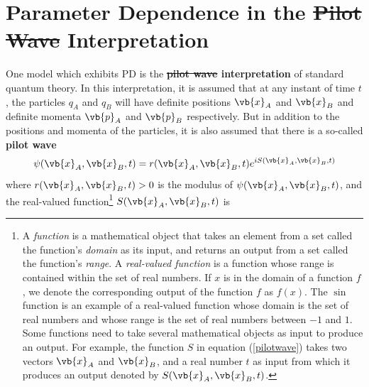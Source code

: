 \documentclass[12pt]{report}
\providecommand{\DIFadd}[1]{{\protect\color{blue}\uwave{#1}}} %
\providecommand{\DIFdel}[1]{{\protect\color{red}\sout{#1}}}                      %
\providecommand{\DIFaddbegin}{} %
\providecommand{\DIFaddend}{} %
\providecommand{\DIFdelbegin}{} %
\providecommand{\DIFdelend}{} %
\begin{document}
\section{Parameter Dependence in the \DIFdelbegin \DIFdel{Pilot Wave }\DIFdelend \DIFaddbegin \DIFadd{Bohmian }\DIFaddend Interpretation}\label{PI}
One model which exhibits PD is the \textbf{\DIFdelbegin \DIFdel{pilot wave }\DIFdelend \DIFaddbegin \DIFadd{Bohmian }\DIFaddend interpretation}\DIFdelbegin %
\DIFdelend \DIFaddbegin {} \DIFaddend of standard quantum theory. In this interpretation, it is assumed that at any instant of time $t$, the particles $q_A$ and $q_B$ will have definite positions $\vb{x}_A$ and $\vb{x}_B$ %
\DIFdelbegin %
\DIFdelend \DIFaddbegin {}\DIFaddend %
and definite momenta $\vb{p}_A$ and $\vb{p}_B$ %
\DIFdelbegin %
\DIFdelend \DIFaddbegin {}\DIFaddend %
respectively. But in addition to the positions and momenta of the particles, it is also assumed that there is a so-called \textbf{pilot wave} 
\begin{equation}\label{pilotwave}
\psi(\vb{x}_A, \vb{x}_B, t)=r(\vb{x}_A, \vb{x}_B, t)e^{i S(\vb{x}_A, \vb{x}_B, t)} 
\end{equation}where $r(\vb{x}_A, \vb{x}_B, t)>0$ %
% 
is the modulus of $\psi(\vb{x}_A, \vb{x}_B, t)$, %
%
and the real-valued function\footnote{A \emph{function} is a mathematical object that takes an element from a set called the function's \emph{domain} as its input, and returns an output from a set called the function's \emph{range}. A \emph{real-valued function} is a function whose range is contained within the set of real numbers. If $x$ is in the domain of a function $f$, we denote the corresponding output of the function $f$ as $f(x)$. The $\sin$ function is an example of a real-valued function whose domain is the set of real numbers and whose range is the set of real numbers between $-1$ and $1$. Some functions need to  take several mathematical objects as input to produce an output. For example, the function $S$ in equation (\ref{pilotwave}) takes two vectors $\vb{x}_A$ and $\vb{x}_B$, and a real number $t$ as input from which it produces an output denoted by $S(\vb{x}_A, \vb{x}_B, t)$.} $S(\vb{x}_A, \vb{x}_B,t )$ is %
\end{document}
